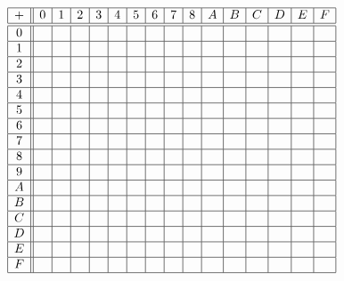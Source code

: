 \documentclass[letterpaper,12pt,fleqn]{article}
\begin{document}
\begin{enumerate}[left=0in,itemsep=0.5in]
  \bigskip

  \(\begin{array}{|c||c|c|c|c|c|c|c|c|c|c|c|c|c|c|c|c|}
  \hline
  + & 0 & 1 & 2 & 3 & 4 & 5 & 6 & 7 & 8 & A & B & C & D & E & F \\
  \hline
  \hline
  0 & & & & & & & & & & & & & & & \\
  \hline
  1 & & & & & & & & & & & & & & & \\
  \hline
  2 & & & & & & & & & & & & & & & \\
  \hline
  3 & & & & & & & & & & & & & & & \\
  \hline
  4 & & & & & & & & & & & & & & & \\
  \hline
  5 & & & & & & & & & & & & & & & \\
  \hline
  6 & & & & & & & & & & & & & & & \\
  \hline
  7 & & & & & & & & & & & & & & & \\
  \hline
  8 & & & & & & & & & & & & & & & \\
  \hline
  9 & & & & & & & & & & & & & & & \\
  \hline
  A & & & & & & & & & & & & & & & \\
  \hline
  B & & & & & & & & & & & & & & & \\
  \hline
  C & & & & & & & & & & & & & & & \\
  \hline
  D & & & & & & & & & & & & & & & \\
  \hline
  E & & & & & & & & & & & & & & & \\
  \hline
  F & & & & & & & & & & & & & & & \\
  \hline
  \end{array}\)


\end{enumerate}
\end{document}
